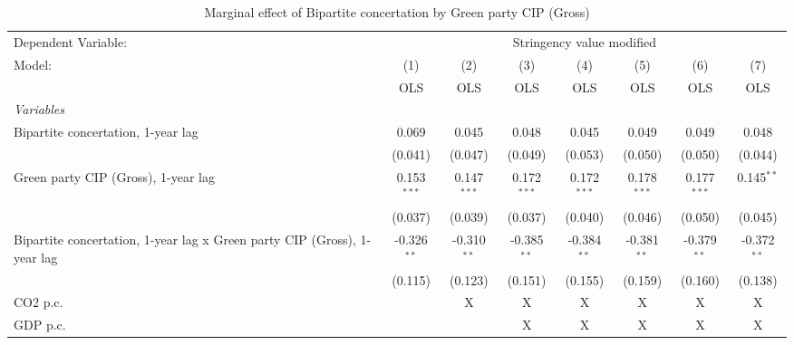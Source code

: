 
\begin{table}[htbp]
   \caption{Marginal effect of Bipartite concertation by Green party CIP (Gross)}
   \centering
   \begin{tabular}{lccccccc}
      \toprule
      Dependent Variable: & \multicolumn{7}{c}{Stringency value modified}\\
      Model:                                                                   & (1)           & (2)           & (3)           & (4)           & (5)           & (6)           & (7)\\  
                                                                               &  OLS          & OLS           & OLS           & OLS           & OLS           & OLS           & OLS\\  
      \midrule
      \emph{Variables}\\
      Bipartite concertation, 1-year lag                                       & 0.069         & 0.045         & 0.048         & 0.045         & 0.049         & 0.049         & 0.048\\   
                                                                               & (0.041)       & (0.047)       & (0.049)       & (0.053)       & (0.050)       & (0.050)       & (0.044)\\   
      Green party CIP (Gross), 1-year lag                                      & 0.153$^{***}$ & 0.147$^{***}$ & 0.172$^{***}$ & 0.172$^{***}$ & 0.178$^{***}$ & 0.177$^{***}$ & 0.145$^{**}$\\   
                                                                               & (0.037)       & (0.039)       & (0.037)       & (0.040)       & (0.046)       & (0.050)       & (0.045)\\   
      Bipartite concertation, 1-year lag x Green party CIP (Gross), 1-year lag & -0.326$^{**}$ & -0.310$^{**}$ & -0.385$^{**}$ & -0.384$^{**}$ & -0.381$^{**}$ & -0.379$^{**}$ & -0.372$^{**}$\\   
                                                                               & (0.115)       & (0.123)       & (0.151)       & (0.155)       & (0.159)       & (0.160)       & (0.138)\\   
      CO2 p.c.                                                                 &               & X             & X             & X             & X             & X             & X\\  
      GDP p.c.                                                                 &               &               & X             & X             & X             & X             & X\\  

\end{tabular}
\end{table}
